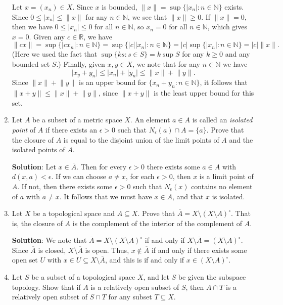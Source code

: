 \documentclass[letterpaper,12pt]{article}
\newcommand{\abs}[1]{\lvert #1\rvert}
\newcommand{\len}[1]{\lVert #1\rVert}
\newcommand{\R}{\mathbb{R}}
\newcommand{\N}{\mathbb{N}}
\begin{document}
\begin{enumerate}
Let $x=(x_n)\in X$. Since $x$ is bounded, $\len{x}=\sup\{\abs{x_n}:n\in\N\}$ exists. Since $0\leq \abs{x_n}\leq \len{x}$ for any $n\in \N$, we see that $\len{x}\geq 0$. If $\len{x}=0$, then we have $0\leq \abs{x_n}\leq 0$ for all $n\in\N$, so $x_n=0$ for all $n\in \N$, which gives $x=0$. Given any $c\in \R$, we have
\[
 \len{cx} = \sup\{\abs{cx_n}:n\in\N\} = \sup\{\abs{c}\abs{x_n}:n\in\N\} = \abs{c}\sup\{\abs{x_n}:n\in\N\} = \abs{c}\len{x}.
\]
(Here we used the fact that $\sup\{ks:s\in S\} = k\sup S$ for any $k\geq 0$ and any bounded set $S$.)
Finally, given $x,y\in X$, we note that for any $n\in \N$ we have
\[
 \abs{x_y+y_n}\leq \abs{x_n}+\abs{y_n}\leq \len{x}+\len{y}.
\]
Since $\len{x}+\len{y}$ is an upper bound for $\{x_n+y_n:n\in\N\}$, it follows that $\len{x+y}\leq \len{x}+\len{y}$, since $\len{x+y}$ is the least upper bound for this set.

\item Let $A$ be a subset of a metric space $X$. An element $a\in A$ is called an {\em isolated point} of $A$ if there exists an $\epsilon>0$ such that $N_\epsilon(a)\cap A = \{a\}$. Prove that the closure of $A$ is equal to the disjoint union of the limit points of $A$ and the isolated points of $A$.

\bigskip

{\bf Solution}: Let $x\in \overline{A}$. Then for every $\epsilon>0$ there exists some $a\in A$ with $d(x,a)<\epsilon$. If we can choose $a\neq x$, for each $\epsilon>0$, then $x$ is a limit point of $A$. If not, then there exists some $\epsilon>0$ such that $N_\epsilon(x)$ contains no element of $a$ with $a\neq x$. It follows that we must have $x\in A$, and that $x$ is isolated. 

\item Let $X$ be a topological space and $A\subseteq X$. Prove that $\overline{A} = X\setminus (X\setminus A)^\circ$. That is, the closure of $A$ is the complement of the interior of the complement of $A$.

\bigskip

{\bf Solution}: We note that $\overline{A} = X\setminus (X\setminus A)^\circ$ if and only if $X\setminus \overline{A} = (X\setminus A)^\circ$. Since $\overline{A}$ is closed, $X\setminus \overline{A}$ is open. Thus, $x\notin \overline{A}$ if and only if there exists some open set $U$ with $x\in U\subseteq X\setminus\overline{A}$, and this is if and only if $x\in (X\setminus A)^\circ$.

\item Let $S$ be a subset of a topological space $X$, and let $S$ be given the subspace topology. Show that if $A$ is a relatively open subset of $S$, then $A\cap T$ is a relatively open subset of $S\cap T$ for any subset $T\subseteq X$.


\end{enumerate}
\end{document}
